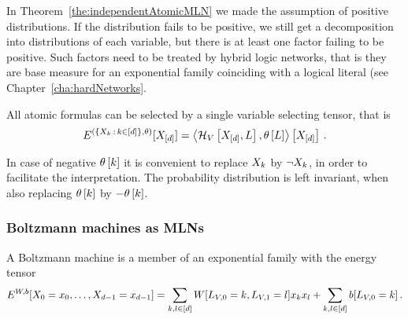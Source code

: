 
In Theorem~\ref{the:independentAtomicMLN} we made the assumption of positive distributions.
If the distribution fails to be positive, we still get a decomposition into distributions of each variable, but there is at least one factor failing to be positive.
Such factors need to be treated by hybrid logic networks, that is they are base measure for an exponential family coinciding with a logical literal (see Chapter~\ref{cha:hardNetworks}.

All atomic formulas can be selected by a single variable selecting tensor, that is
	\[ E^{(\{X_{k} \, : \, k\in[d]\},\theta)}[X_{[d]}]
	= \left\langle \mathcal{H}_{V}\left[X_{[d]},L\right],\theta\left[L\right]\right\rangle \left[ X_{[d]} \right] \, . 
	\]
	
In case of negative $\theta\left[k\right]$ it is convenient to replace $X_{k}$ by $\lnot X_{k}$, in order to facilitate the interpretation.
The probability distribution is left invariant, when also replacing $\theta\left[k\right]$ by $-\theta\left[k\right]$.



\subsubsection{Boltzmann machines as MLNs}


A Boltzmann machine is a member of an exponential family with the energy tensor
	\[ E^{W,b}[X_{0}=x_{0},\ldots,X_{d-1}=x_{d-1}] = 
	\sum_{k,l \in [d]} 
		W[L_{V,0}=k, L_{V,1}=l] x_{k} x_{l} 
	+ \sum_{k,l \in [d]} b[L_{V,0}=k] \, . \]



